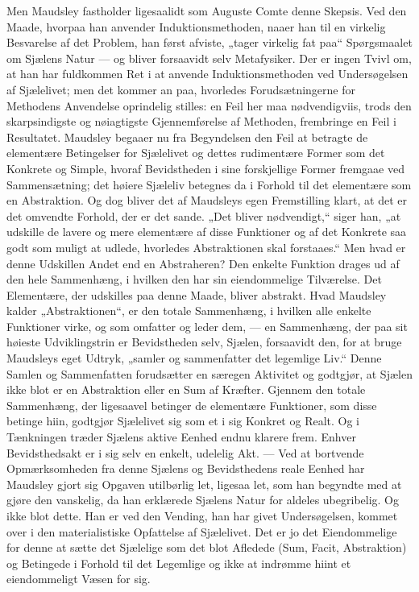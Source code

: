 \documentclass[12pt,a4paper,openany]{book}
\newcommand{\opage}[1]{\marginnote{\footnotesize\textit{[#1]}}}
\begin{document}
Men Maudsley fastholder ligesaalidt som Auguste Comte
denne Skepsis. Ved den Maade, hvorpaa han anvender
Induktionsmethoden, naaer han til en virkelig Besvarelse af
det Problem, han først afviste, „tager virkelig fat paa“ Spørgsmaalet
om Sjælens Natur --- og bliver forsaavidt selv
Metafysiker. Der er ingen Tvivl om, at han har fuldkommen
Ret i at anvende Induktionsmethoden ved Undersøgelsen
af Sjælelivet; men det kommer an paa, hvorledes Forudsætningerne
for Methodens Anvendelse oprindelig stilles: en Feil
her maa nødvendigviis, trods den skarpsindigste og nøiagtigste
\opage{313}Gjennemførelse af Methoden, frembringe en Feil i Resultatet.
Maudsley begaaer nu fra Begyndelsen den Feil at betragte
de elementære Betingelser for Sjælelivet og dettes
rudimentære Former som det Konkrete og Simple, hvoraf
Bevidstheden i sine forskjellige Former fremgaae ved Sammensætning;
det høiere Sjæleliv betegnes da i Forhold til det
elementære som en Abstraktion. Og dog bliver det af
Maudsleys egen Fremstilling klart, at det er det omvendte
Forhold, der er det sande. „Det bliver nødvendigt,“ siger
han, „at udskille de lavere og mere elementære af disse
Funktioner og af det Konkrete saa godt som muligt at udlede,
hvorledes Abstraktionen skal forstaaes.“ Men hvad
er denne Udskillen Andet end en Abstraheren? Den enkelte
Funktion drages ud af den hele Sammenhæng, i hvilken
den har sin eiendommelige Tilværelse. Det Elementære, der
udskilles paa denne Maade, bliver abstrakt. Hvad Maudsley
kalder „Abstraktionen“, er den totale Sammenhæng, i hvilken
alle enkelte Funktioner virke, og som omfatter og leder dem,
--- en Sammenhæng, der paa sit høieste Udviklingstrin er
Bevidstheden selv, Sjælen, forsaavidt den, for at bruge
Maudsleys eget Udtryk, „samler og sammenfatter det legemlige
Liv.“ Denne Samlen og Sammenfatten forudsætter en
særegen Aktivitet og godtgjør, at Sjælen ikke blot er en
Abstraktion eller en Sum af Kræfter. Gjennem den totale
Sammenhæng, der ligesaavel betinger de elementære Funktioner,
som disse betinge hiin, godtgjør Sjælelivet sig som
et i sig Konkret og Realt. Og i Tænkningen træder Sjælens
aktive Eenhed endnu klarere frem. Enhver Bevidsthedsakt er
i sig selv en enkelt, udelelig Akt. --- Ved at bortvende Opmærksomheden
fra denne Sjælens og Bevidsthedens reale
Eenhed har Maudsley gjort sig Opgaven utilbørlig let,
ligesaa let, som han begyndte med at gjøre den vanskelig, da
han erklærede Sjælens Natur for aldeles ubegribelig. Og
ikke blot dette. Han er ved den Vending, han har givet
Undersøgelsen, kommet over i den materialistiske Opfattelse
af Sjælelivet. Det er jo det Eiendommelige for denne at
\opage{314}sætte det Sjælelige som det blot Afledede (Sum, Facit,
Abstraktion) og Betingede i Forhold til det Legemlige og
ikke at indrømme hiint et eiendommeligt Væsen for sig.
\end{document}
